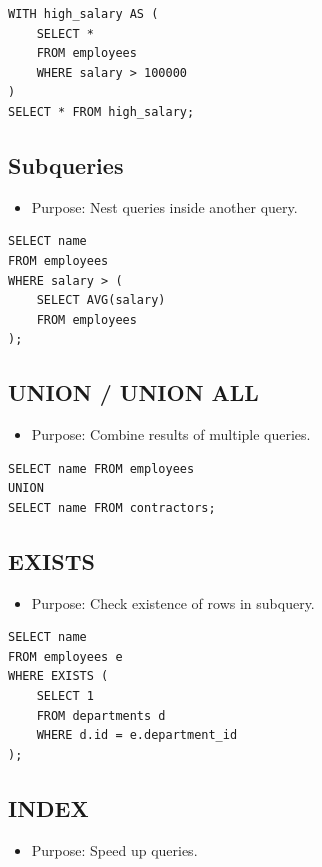 \documentclass[10pt]{article}
\begin{document}
\begin{verbatim}
WITH high_salary AS (
    SELECT *
    FROM employees
    WHERE salary > 100000
)
SELECT * FROM high_salary;
\end{verbatim}

\newpage
\subsection{\textbf{Subqueries}}
\begin{itemize}
    \item Purpose: Nest queries inside another query.
\end{itemize}

\begin{verbatim}
SELECT name
FROM employees
WHERE salary > (
    SELECT AVG(salary)
    FROM employees
);
\end{verbatim}

\subsection{UNION / UNION ALL}
\begin{itemize}
    \item Purpose: Combine results of multiple queries.
\end{itemize}

\begin{verbatim}
SELECT name FROM employees
UNION
SELECT name FROM contractors;
\end{verbatim}

\subsection{EXISTS}
\begin{itemize}
    \item Purpose: Check existence of rows in subquery.
\end{itemize}

\begin{verbatim}
SELECT name
FROM employees e
WHERE EXISTS (
    SELECT 1
    FROM departments d
    WHERE d.id = e.department_id
);
\end{verbatim}

\subsection{INDEX}
\begin{itemize}
    \item Purpose: Speed up queries.
\end{itemize}
\end{document}

